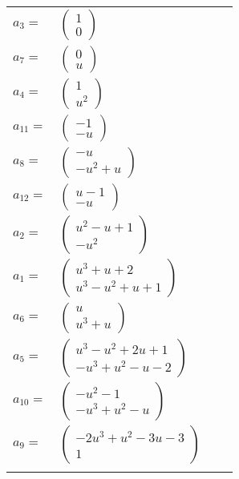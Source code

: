 \documentclass[1p]{elsarticle_modified}
\theoremstyle{definition}
\begin{document}
\begin{tabular}{m{7pt} m{180pt} m{7pt} m{180pt} }
\flushright $a_{3}=$&$\begin{pmatrix}1\\0\end{pmatrix}$ \\
\flushright $a_{7}=$&$\begin{pmatrix}0\\u\end{pmatrix}$ \\
\flushright $a_{4}=$&$\begin{pmatrix}1\\u^2\end{pmatrix}$ \\
\flushright $a_{11}=$&$\begin{pmatrix}-1\\- u\end{pmatrix}$ \\
\flushright $a_{8}=$&$\begin{pmatrix}- u\\- u^2+u\end{pmatrix}$ \\
\flushright $a_{12}=$&$\begin{pmatrix}u-1\\- u\end{pmatrix}$ \\
\flushright $a_{2}=$&$\begin{pmatrix}u^2- u+1\\- u^2\end{pmatrix}$ \\
\flushright $a_{1}=$&$\begin{pmatrix}u^3+u+2\\u^3- u^2+u+1\end{pmatrix}$ \\
\flushright $a_{6}=$&$\begin{pmatrix}u\\u^3+u\end{pmatrix}$ \\
\flushright $a_{5}=$&$\begin{pmatrix}u^3- u^2+2 u+1\\- u^3+u^2- u-2\end{pmatrix}$ \\
\flushright $a_{10}=$&$\begin{pmatrix}- u^2-1\\- u^3+u^2- u\end{pmatrix}$ \\
\flushright $a_{9}=$&$\begin{pmatrix}-2 u^3+u^2-3 u-3\\1\end{pmatrix}$\\&\end{tabular}
\end{document}
